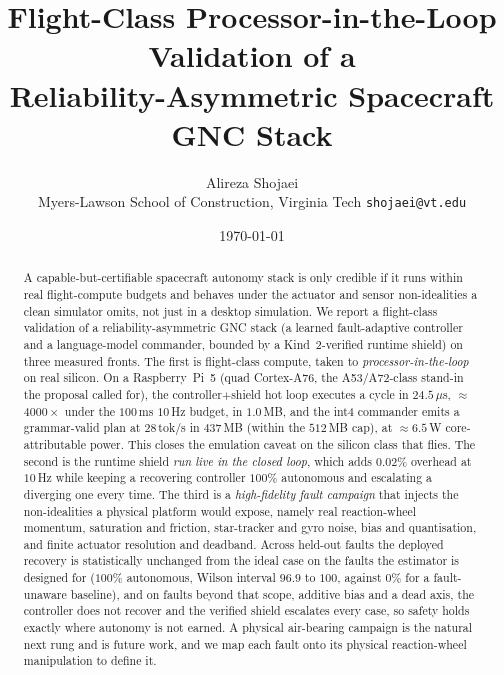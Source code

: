 \documentclass[11pt]{article}
\title{\textbf{Flight-Class Processor-in-the-Loop Validation of a\\
Reliability-Asymmetric Spacecraft GNC Stack}}
\author{Alireza Shojaei\\ \small Myers-Lawson School of Construction, Virginia Tech \quad \texttt{shojaei@vt.edu}}
\date{\today}
\begin{document}
\maketitle

\begin{abstract}
A capable-but-certifiable spacecraft autonomy stack is only credible if it runs within real
flight-compute budgets and behaves under the actuator and sensor non-idealities a clean
simulator omits, not just in a desktop simulation. We report a flight-class validation of a
reliability-asymmetric GNC stack (a learned fault-adaptive controller and a language-model
commander, bounded by a Kind~2-verified runtime shield) on three measured fronts. The first is
flight-class compute, taken to \emph{processor-in-the-loop} on real silicon. On a
Raspberry~Pi~5 (quad Cortex-A76, the A53/A72-class stand-in the proposal called for), the
controller$+$shield hot loop executes a cycle in $24.5\,\mu$s, $\approx$$4000\times$ under the
$100$\,ms $10$\,Hz budget, in $1.0$\,MB, and the int4 commander emits a grammar-valid plan at
$28$\,tok/s in $437$\,MB (within the $512$\,MB cap), at $\approx$$6.5$\,W core-attributable
power. This closes the emulation caveat on the silicon class that flies. The second is the
runtime shield \emph{run live in the closed loop}, which adds $0.02\%$ overhead at $10$\,Hz
while keeping a recovering controller $100\%$ autonomous and escalating a diverging one every
time. The third is a \emph{high-fidelity fault campaign} that injects the non-idealities a
physical platform would expose, namely real reaction-wheel momentum, saturation and friction,
star-tracker and gyro noise, bias and quantisation, and finite actuator resolution and
deadband. Across held-out faults the deployed recovery is statistically unchanged from the
ideal case on the faults the estimator is designed for ($100\%$ autonomous, Wilson interval
$96.9$ to $100$, against $0\%$ for a fault-unaware baseline), and on faults beyond that scope,
additive bias and a dead axis, the controller does not recover and the verified shield
escalates every case, so safety holds exactly where autonomy is not earned. A physical
air-bearing campaign is the natural next rung and is future work, and we map each fault onto
its physical reaction-wheel manipulation to define it.
\end{abstract}
\end{document}

